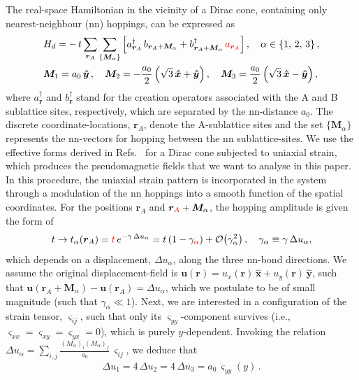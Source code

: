 \documentclass[aps,prb, onecolumn, nofootinbib, citeautoscript,10pt]{revtex4-2}
\newcommand{\red}[1]{{\color{red}#1}}
\newcommand{\bs}[1]{\boldsymbol{#1}}
\def \nn{\nonumber \\}
\begin{document}
The real-space Hamiltonian in the vicinity of a Dirac cone, containing only nearest-neighbour (nn) hoppings, can be expressed as
\begin{align}
\label{eqnn}
& H_d = -\, t \sum_{\bs r_A} \sum \limits_{ \lbrace \bs M_\alpha \rbrace } \left[ 
a_{\bs r_A}^\dagger \, b_{\bs r_A + \bs M_\alpha} + b_{\bs r_A + \bs M_\alpha }^\dagger \, \red{a_{\bs r_A}}
\right ], \quad \alpha \in \lbrace 1, \,2 ,\, 3 \rbrace \,,\nn
& \bs M_1 = a_0 \, \bs{\hat y}\,, \quad \bs M_2 = - \frac{a_0}{2} \left(\sqrt 3 \,\bs{\hat x} + \bs{\hat y}\right),
\quad \bs M_3 =  \frac{a_0}{2} \left(\sqrt 3 \,\bs{\hat x} - \bs{\hat y}\right),
\end{align}
where $a^\dagger_{\bs r}$ and $b ^\dagger _{\bs r}$ stand for the creation operators associated with the A and B sublattice sites, respectively, which are separated by the nn-distance $a_0$. The discrete coordinate-locations, $\bs r_A$\red{, denote} the A-sublattice sites and the set $\lbrace \bs M_\alpha \rbrace$ represents the nn-vectors for hopping between the nn sublattice-sites. We use the effective forms derived in Refs.~\cite{neto-strain-graphene, strained-dirac-franz} for a Dirac cone subjected to uniaxial strain, which produces the pseudomagnetic fields that we want to \red{analyse} in this paper. In this procedure, the uniaxial strain pattern is incorporated in the system through a modulation of the nn hoppings into a  smooth function of the spatial coordinates. For the positions $\bs r_A $ and $\bs r_\red{A} + \bs M_\alpha $, the hopping amplitude is given the form of 
\begin{align}
t \rightarrow t_{\alpha}(\bs r_A) 
 = \red{t}\, e^{-\gamma \,\Delta u_\alpha }
=  t  \left ( 1 -  \gamma_\red{\alpha} \right)
 + \order{ \gamma _\alpha^2 } \,, \quad \gamma_\alpha \equiv \gamma\, \Delta u_\alpha, 
\end{align}
which depends on a displacement, $ \Delta u_{\alpha}$, along the three nn-bond directions. We assume the original displacement-field is $\bs u (\bs r) = u_x (\bs r)  \, \bs {\hat x} + u_y (\bs r) \, \bs {\hat y}$, such that $\bs u ({\bs r_A} + {}\bs M_\alpha) - \bs u (\bs r_A) = \Delta u_\alpha $, which we postulate to be of small magnitude (such that $\gamma_\alpha \ll 1 $).
Next, we are interested in a configuration of the strain tensor, $\varsigma_{ij}$, such that only its $\varsigma_{yy}$-component survives (i.e., $ \varsigma_{xx} = \varsigma_{xy} = \varsigma_{yx} = 0 $), which is purely $y$-dependent. Invoking the relation $\Delta u_{\alpha} = \sum_{i, j} \frac{ \left(M_\alpha \right)_i \left( M_\alpha\right)_j } {a_0}\,\varsigma_{ij}$, we deduce that
\begin{align}
\Delta u_1 = 4\, \Delta u_2 = 4 \, \Delta u_3 = a_0\, \varsigma_{yy}  (y)\,.
\end{align}
\end{document}
